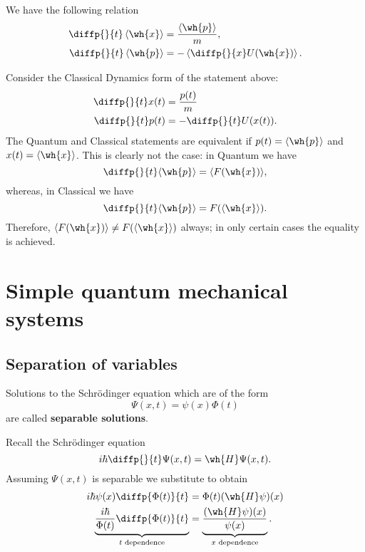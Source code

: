 \documentclass[12pt, a4paper]{article}
\begin{document}
\begin{mdthm}
    We have the following relation
    \[\begin{aligned}
        \diffp{}{t} \left\langle \wh{x} \right\rangle &=  \frac{\left\langle \wh{p} \right\rangle}{m}, \\
        \diffp{}{t} \left\langle \wh{p} \right\rangle &= - \left\langle \diffp{}{x}U(\wh{x}) \right\rangle.
    \end{aligned}\]
\end{mdthm}

\begin{mdremark}
    Consider the Classical Dynamics form of the statement above:
    \[\begin{aligned}
        \diffp{}{t} x(t) &= \frac{p(t)}{m} \\
        \diffp{}{t} p(t) &= -\diffp{}{t} U(x(t)).
    \end{aligned}\]
    The Quantum and Classical statements are equivalent if \(p(t) = \langle \wh{p} \rangle\) and \(x(t) = \langle \wh{x} \rangle\). This is clearly not the case: in Quantum we have 
    \[\diffp{}{t} \langle \wh{p} \rangle = \langle F(\wh{x}) \rangle ,\]
    whereas, in Classical we have
    \[\diffp{}{t} \langle \wh{p} \rangle =  F(\langle \wh{x}\rangle).\]
    Therefore, \(\langle F(\wh{x}) \rangle \neq F(\langle \wh{x} \rangle)\) always; in only certain cases the equality is achieved.
\end{mdremark}

\section{Simple quantum mechanical systems}

\subsection{Separation of variables}

\begin{definition}
    Solutions to the Schrödinger equation which are of the form 
    \[\Psi(x,t) = \psi(x)\Phi(t)\]
    are called \textbf{separable solutions}.
\end{definition}

Recall the Schrödinger equation 
\[i \hbar \diffp{}{t}\Psi(x,t) = \wh{H} \Psi(x,t).\]
Assuming \(\Psi(x,t)\) is separable we substitute to obtain 
\[\begin{aligned}
    i\hbar \psi(x) \diffp{\Phi(t)}{t} &= \Phi(t) (\wh{H}\psi)(x) \\
    \underbrace{\frac{i \hbar}{\Phi(t)} \diffp{\Phi(t)}{t}}_{t \text{ dependence}} &= \underbrace{\frac{(\wh{H}\psi)(x)}{\psi(x)}}_{x \text{ dependence}}.
\end{aligned}\]
\end{document}
